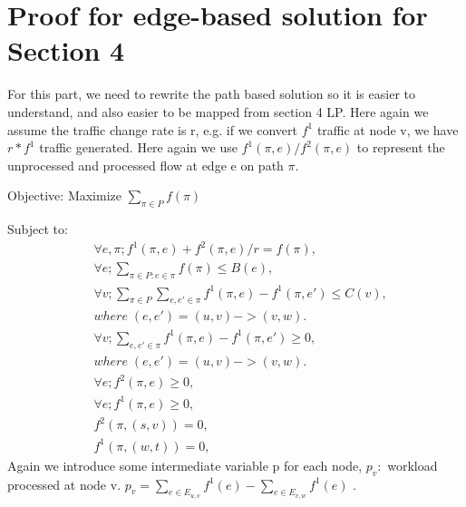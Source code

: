 \documentclass[twoside,leqno, 11pt]{article}
\begin{document}
\section{Proof for edge-based solution for Section 4}
For this part, we need to rewrite the path based solution so it is easier to understand, and also easier to be mapped from section 4 LP. Here again we assume the traffic change rate is r, e.g. if we convert $ f^1$ traffic at node v, we have $r*f^1$ traffic generated. Here again we use $f^1(\pi, e) /f^2(\pi, e)$ to represent the unprocessed and processed flow at edge e on path $\pi$.

Objective: Maximize  $\sum \limits_{\pi\in P} f(\pi) $
\newline

Subject to:
\newline
\begin{subequations}
\begin{align}
&\forall e, \pi;  f^1(\pi, e) +f^2(\pi, e)/r= f(\pi),\\
&\forall e; \sum \limits_{\pi\in P:e\in \pi} f(\pi) \leq B(e),\\
&\forall  v; \sum \limits_{\pi\in P} \sum \limits_{ e,e'\in \pi} f^1(\pi, e) -f^1(\pi, e')\leq C(v),\\
& where \;(e, e') = (u,v)->(v,w).\nonumber\\
&\forall  v; \sum \limits_{ e,e'\in \pi} f^1(\pi, e) -f^1(\pi, e')\geq 0,\\
& where \;(e, e') = (u,v)->(v,w).\nonumber\\
&\forall e; f^2(\pi,e)\geq 0, \\
&\forall e; f^1(\pi,e)\geq 0, \\
&f^2(\pi,(s,v))= 0, \\
&f^1(\pi, (w,t)) =0, 
\end{align}
\end{subequations}
Again we introduce some intermediate variable p for each node, $p_v: $ workload processed at node v.
\newline
$p_v = \sum\limits_{e \in E_{u, v} } f^1(e) - \sum\limits_{e \in E_{v, w} } f^1(e)  $ .
\newline
{}
   
\end{document}
